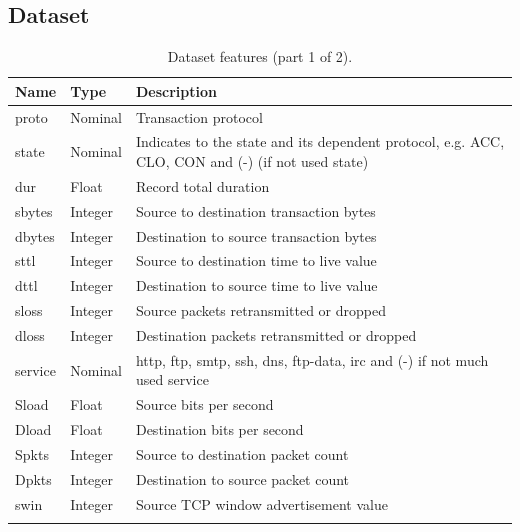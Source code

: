\documentclass[conference, 10pt]{IEEEtran}
\begin{document}
\appendices
  
\subsection{Dataset}
\label{sec: dataset}

\begin{table}[H]
    \caption{Dataset features (part 1 of 2).}\label{tab:features1}
    \scriptsize
    \setlength{\tabcolsep}{3pt}
    \renewcommand{\arraystretch}{1.1}
    \begin{tabularx}{\columnwidth}{@{}>{\ttfamily}l l >{\raggedright\arraybackslash}X@{}}
    \toprule
    \textbf{Name} & \textbf{Type} & \textbf{Description} \\
    \midrule
    proto & Nominal & Transaction protocol \\ \addlinespace[4pt]
    state & Nominal & Indicates to the state and its dependent protocol, e.g. ACC, CLO, CON and (-) (if not used state) \\ \addlinespace[4pt]
    dur & Float & Record total duration \\ \addlinespace[4pt]
    sbytes & Integer & Source to destination transaction bytes \\ \addlinespace[4pt]
    dbytes & Integer & Destination to source transaction bytes \\ \addlinespace[4pt]
    sttl & Integer & Source to destination time to live value \\ \addlinespace[4pt]
    dttl & Integer & Destination to source time to live value \\ \addlinespace[4pt]
    sloss & Integer & Source packets retransmitted or dropped \\ \addlinespace[4pt]
    dloss & Integer & Destination packets retransmitted or dropped \\ \addlinespace[4pt]
    service & Nominal & http, ftp, smtp, ssh, dns, ftp-data, irc and (-) if not much used service \\ \addlinespace[4pt]
    Sload & Float & Source bits per second \\ \addlinespace[4pt]
    Dload & Float & Destination bits per second \\ \addlinespace[4pt]
    Spkts & Integer & Source to destination packet count \\ \addlinespace[4pt]
    Dpkts & Integer & Destination to source packet count \\ \addlinespace[4pt]
    swin & Integer & Source TCP window advertisement value \\ \addlinespace[4pt]

\end{tabularx}
\end{table}
\end{document}
